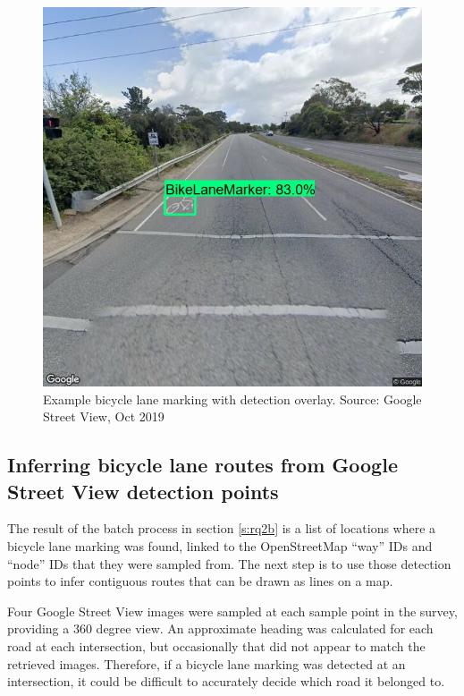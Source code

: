 \documentclass[11pt,twoside]{report}
\begin{document}
\begin{figure}[h!]
\centering
\includegraphics[scale=0.3]{f004_gsv_detection_example.jpg}
\caption{Example bicycle lane marking with detection overlay.  Source: Google Street View, Oct 2019}
\label{fig:004}
\end{figure}


\subsection{Inferring bicycle lane routes from Google Street View detection points}
\label{s:rq2c}

The result of the batch process in section \ref{s:rq2b} is a list of locations where a bicycle lane marking was found, linked to the OpenStreetMap ``way'' IDs and ``node'' IDs that they were sampled from.  The next step is to use those detection points to infer contiguous routes that can be drawn as lines on a map.

Four Google Street View images were sampled at each sample point in the survey, providing a 360 degree view.  An approximate heading was calculated for each road at each intersection, but occasionally that did not appear to match the retrieved images.  Therefore, if a bicycle lane marking was detected at an intersection, it could be difficult to accurately decide which road it belonged to.
\end{document}
